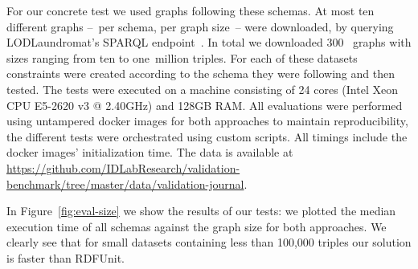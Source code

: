 For our concrete test 
we used graphs following these  schemas.
At most ten different \rdf graphs --~per schema, per \rdf graph size~-- were downloaded,
by querying LODLaundromat's SPARQL endpoint~\cite{beek2014lod}.
In total we downloaded
300~%
graphs with sizes ranging from ten to one~million triples. For each of these datasets constraints were created according to the schema they were following and then tested.
The tests were executed on a  machine consisting of 24 cores (Intel Xeon CPU E5-2620 v3 @ 2.40GHz) and 128GB RAM.
All evaluations were performed using untampered docker images for both approaches to maintain reproducibility,
the different tests were orchestrated using custom scripts.
All timings include the docker images' initialization time.
The data is available at \url{https://github.com/IDLabResearch/validation-benchmark/tree/master/data/validation-journal}.

In Figure~\ref{fig:eval-size} we show the results of our tests: we plotted the median execution time of all schemas against the \rdf graph size for both approaches.
We clearly see that for small datasets containing less than 100,000 triples our solution is faster than RDFUnit. 



